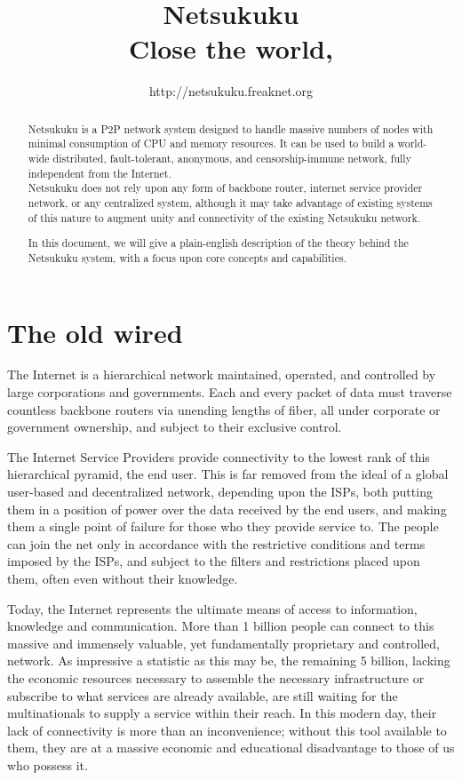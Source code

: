 \documentclass[a4paper]{article}
\title{Netsukuku\\
{\small Close the world, \reflectbox{Open the next}}}
\author{http://netsukuku.freaknet.org}
\begin{document}
\maketitle

\begin{abstract}
Netsukuku is a P2P network system designed to handle massive numbers of nodes 
with minimal consumption of CPU and memory resources.  It can be used to build a
world-wide distributed, fault-tolerant, anonymous, and censorship-immune network,
fully independent from the Internet.\\
Netsukuku does not rely upon any form of backbone router, internet service 
provider network, or any centralized system, although it may take advantage of
existing systems of this nature to augment unity and connectivity of the 
existing Netsukuku network. 

In this document, we will give a plain-english description of the theory 
behind the Netsukuku system, with a focus upon core concepts and capabilities.
\end{abstract}


\section{The old wired}

The Internet is a hierarchical network maintained, operated, and controlled 
by large corporations and governments.  Each and every packet of data must 
traverse countless backbone routers via unending lengths of fiber, all 
under corporate or government ownership, and subject to their exclusive control.

The Internet Service Providers provide connectivity to the lowest rank of
this hierarchical pyramid, the end user.
This is far removed from the ideal of a global user-based and decentralized 
network, depending upon the ISPs, both putting them in a position of power 
over the data received by the end users, and making them a single point of
failure for those who they provide service to.
The people can join the net only in accordance with the restrictive conditions
and terms imposed by the ISPs, and subject to the filters and restrictions
placed upon them, often even without their knowledge.

Today, the Internet represents the ultimate means of access to information, 
knowledge and communication.  More than 1 billion people\cite{mwmgstats}
can connect to this massive and immensely valuable, yet fundamentally 
proprietary and controlled, network. As impressive a statistic as this may
be, the remaining 5 billion, lacking the economic resources necessary to 
assemble the necessary infrastructure or subscribe to what services are 
already available, are still waiting for the multinationals to supply a 
service within their reach.  In this modern day, their lack of connectivity 
is more than an inconvenience; without this tool available to them, they 
are at a massive economic and educational disadvantage to those of us 
who possess it. \\
\end{document}
